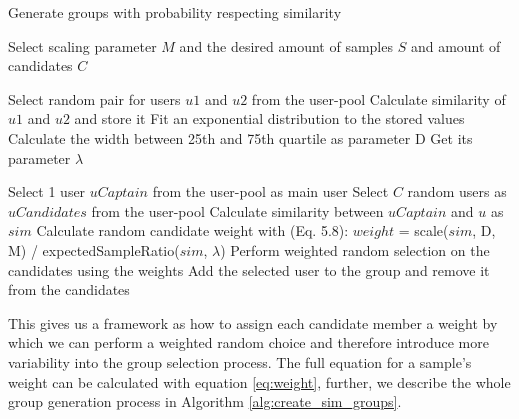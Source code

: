 \begin{algorithm}
	\caption{Generate groups with probability respecting similarity}
	\begin{algorithmic}[1]
	    \State Select scaling parameter $M$ and the desired amount of samples $S$ and amount of candidates $C$
	
	    \vspace{3mm}
	
    	    \State Select random pair for users $u1$ and $u2$ from the user-pool
    	    \State Calculate similarity of $u1$ and $u2$ and store it
	    \EndFor
	    \State Fit an exponential distribution to the stored values
	    \State Calculate the width between 25th and 75th quartile as parameter D
	    \State Get its parameter $\lambda$
	    
	    \vspace{3mm}
	    
    	    \State Select 1 user $uCaptain$ from the user-pool as main user
    	    \State Select $C$ random users as $uCandidates$ from the user-pool
    	        \State Calculate similarity between $uCaptain$ and $u$ as $sim$
    	        \State Calculate random candidate weight with (Eq. 5.8):
    	        \State $weight$ = scale($sim$, D, M) / expectedSampleRatio($sim$, $\lambda$)
    	    \EndFor
    	    \State Perform weighted random selection on the candidates using the weights
    	    \State Add the selected user to the group and remove it from the candidates
    	    \EndFor
        \EndFor
	\end{algorithmic}
	\label{alg:create_sim_groups}
\end{algorithm} 



This gives us a framework as how to assign each candidate member a weight by which we can perform a weighted random choice and therefore introduce more variability into the group selection process. The full equation for a sample's weight can be calculated with equation \ref{eq:weight}, further, we describe the whole group generation process in Algorithm \ref{alg:create_sim_groups}.











